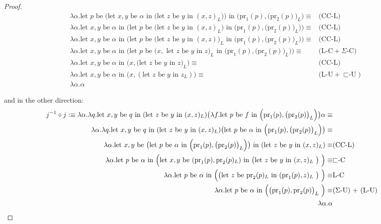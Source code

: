 \begin{thm}
\begin{proof}
\[\begin{split}
    \lambda \alpha. \text{let $p$ be $\big (\text{let $x, y$ be $\alpha$ in (let $z$ be $y$ in $(x, z)_L$)} \big )$ in $\Big (\text{pr}_1(p), \big  (\text{pr}_2(p)\big )_L\Big)$}  \equiv& \text{(CC-L)}\\
    \lambda \alpha. \text{let $x, y$ be $\alpha$ in $\Big ($let $p$ be (let $z$ be $y$ in $(x, z)_L) $ in $\Big (\text{pr}_1(p), \big  (\text{pr}_2(p)\big )_L\Big) \Big )$}  \equiv& \text{(CC-L)}\\
    \lambda \alpha. \text{let $x, y$ be $\alpha$ in $\Big ($let $p$ be (let $z$ be $y$ in $(x, z))_L$ in $\Big (\text{pr}_1(p), \big  (\text{pr}_2(p)\big )_L\Big) \Big )$}  \equiv& \text{(CC-L)}\\
    \lambda \alpha. \text{let $x, y$ be $\alpha$ in $\Big ($let $p$ be ($x,$ let $z$ be $y$ in $z)_L$ in $\Big (\text{pr}_1(p), \big  (\text{pr}_2(p)\big )_L\Big) \Big )$}  \equiv& \text{(L-C} + \text{$\Sigma$-C})\\
    \lambda \alpha. \text{let $x, y$ be $\alpha$ in $\Big (x, \big  ( \text{let $z$ be $y$ in $z$}\big )_L \Big )$}  \equiv& \text{(CC-L)}\\
    \lambda \alpha. \text{let $x, y$ be $\alpha$ in $\Big (x, (\text{let $z$ be $y$ in $z_L$}) \Big )$}  \equiv& \text{(L-U} + \text{$\sqsubset$-U})\\
    \lambda \alpha. \alpha
\end{split}
\]

and in the other direction:
\[
  \begin{split}
    j^{-1} \circ j : \equiv \lambda \alpha. \lambda q. \text{let $x, y$ be $q$ in (let $z$ be $y$ in $(x, z)_L$)} \big ( \lambda f. \text{let $p$ be $f$ in $\Big (\text{pr}_1(p), \big  (\text{pr}_2(p)\big )_L\Big)$}  \big ) \alpha \equiv \\
    \lambda \alpha. \lambda q. \text{let $x, y$ be $q$ in (let $z$ be $y$ in $(x, z)_L$)} \big ( \text{let $p$ be $\alpha$ in $\Big (\text{pr}_1(p), \big  (\text{pr}_2(p)\big )_L\Big)$} \big ) \equiv\\
       \lambda \alpha. \text{let $x, y$ be $\big ( \text{let $p$ be $\alpha$ in $\Big (\text{pr}_1(p), \big  (\text{pr}_2(p)\big )_L\Big)$} \big )$ in (let $z$ be $y$ in $(x, z)_L$)} \equiv& \text{(CC-L)}\\
       \lambda \alpha. \text{let $p$ be $\alpha$ in \Big (let $x, y$ be $(\text{pr}_1(p), \text{pr}_2(p)_L)$ in \big (let $z$ be $y$ in $(x, z)_L$ \big ) \Big )} \equiv& \text{$\sqsubset$-C}\\
       \lambda \alpha. \text{let $p$ be $\alpha$ in \Big (\big (let $z$ be $\text{pr}_2(p)_L$ in $(\text{pr}_1(p), z)_L$ \big ) \Big )} \equiv& \text{L-C}\\
       \lambda \alpha. \text{let $p$ be $\alpha$ in \Big ($\big (\text{pr}_1(p), \text{pr}_2(p) \big )_L$ \Big )} \equiv& \text{($\Sigma$-U) + (L-U)}\\
         \lambda \alpha. \alpha
  \end{split}
\]
\end{proof}
\end{thm}
